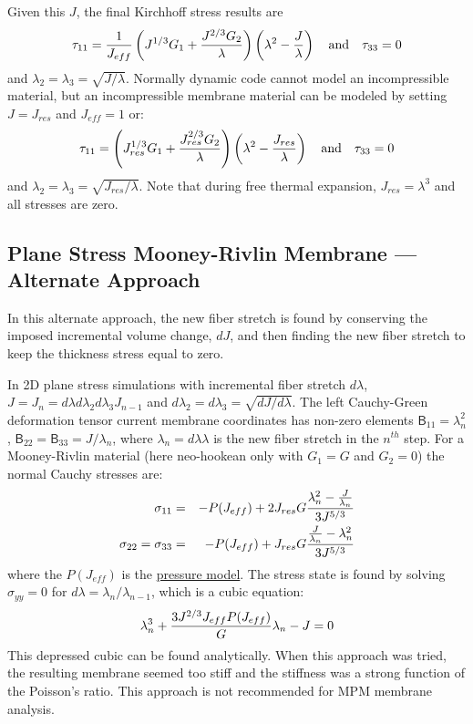 \documentclass[11pt]{book}
\newcommand{\tens}[1]{\boldsymbol{\mathsf{#1}}}
\def\Jeff{J_{eff}}
\def\Jres{J_{res}}
\begin{document}
Given this $J$, the final Kirchhoff stress results are
\begin{equation}
     \tau_{11} =  {1\over \Jeff}\left(J^{1/3}G_1 + {J^{2/3}G_2\over \lambda}\right)\left(\lambda^2-{J\over\lambda}\right) \quad{\rm and}\quad
     \tau_{33} = 0 
\end{equation}
and   $ \lambda_2 = \lambda_3 = \sqrt{J/\lambda}$.
Normally dynamic code cannot model an incompressible material, but an incompressible membrane material can be modeled by setting $J=\Jres$ and $\Jeff = 1$ or:
\begin{equation}
     \tau_{11} = \left(\Jres^{1/3}G_1 + {\Jres^{2/3}G_2\over \lambda}\right)\left(\lambda^2-{\Jres\over\lambda}\right) \quad{\rm and}\quad
     \tau_{33} = 0 
\end{equation}
and $ \lambda_2 = \lambda_3 = \sqrt{\Jres/\lambda}$.
Note that during free thermal expansion, $\Jres=\lambda^3$ and all stresses are zero.

\subsection{Plane Stress Mooney-Rivlin Membrane --- Alternate Approach}

In this alternate approach, the new fiber stretch is found by conserving the imposed incremental volume change, $dJ$, and then finding the new fiber stretch to keep the thickness stress equal to zero.

In 2D plane stress simulations with incremental fiber stretch $d\lambda$, $J = J_n=d\lambda d\lambda_2 d\lambda_3 J_{n-1}$ and $d\lambda_2=d\lambda_3 = \sqrt{dJ/d\lambda}$. The left Cauchy-Green deformation tensor current membrane coordinates has non-zero elements $\tens{B}_{11} = \lambda_n^2$, $\tens{B}_{22} = \tens{B}_{33}=J/\lambda_n$, where $\lambda_n = d\lambda\lambda$ is the new fiber stretch in the $n^{th}$ step. For a Mooney-Rivlin material (here neo-hookean only with $G_1=G$ and $G_2=0$) the normal Cauchy stresses are:
\begin{eqnarray}
      \sigma_{11} & = & -P(\Jeff) + 2\Jres G{\lambda_n^2-{J\over \lambda_n}\over 3J^{5/3}}  \\
      \sigma_{22} = \sigma_{33} & = & -P(\Jeff) +  \Jres G{{J\over \lambda_n}-\lambda_n^2\over 3J^{5/3}}
\end{eqnarray}
where the $P(\Jeff)$ is the \hyperref[PTerms]{pressure model}. The stress state is found by solving $\sigma_{yy}=0$ for $d\lambda=\lambda_n/\lambda_{n-1}$, which is a cubic equation:
\begin{equation}
	 \lambda_n^3+{3J^{2/3}\Jeff P(\Jeff)\over G} \lambda_n - J = 0
\end{equation}
This depressed cubic can be found analytically. When this approach was tried, the resulting membrane seemed too stiff and the stiffness was a strong function of the Poisson's ratio. This approach is not recommended for MPM membrane analysis.
\end{document}
